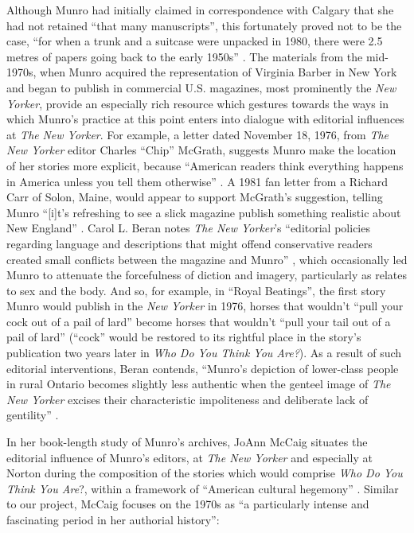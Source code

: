 \begin{paper}
Although Munro had initially claimed in correspondence with Calgary that
she had not retained ``that many manuscripts'', this fortunately proved
not to be the case, ``for when a trunk and a suitcase were unpacked in
1980, there were 2.5 metres of papers going back to the early 1950s''
\citep[xxix]{tener_archival_1986}. The materials from the mid-1970s,
when Munro acquired the representation of Virginia Barber in New York
and began to publish in commercial U.S. magazines, most prominently the
\emph{New Yorker}, provide an especially rich resource which gestures
towards the ways in which Munro's practice at this point enters into
dialogue with editorial influences at \emph{The} \emph{New Yorker}. For example, a letter dated
November 18, 1976, from \emph{The New Yorker} editor Charles
``Chip'' McGrath, suggests Munro make the location of her
stories more explicit, because ``American readers think everything
happens in America unless you tell them otherwise'' \citep{mcgrath_letter_1976}. A 1981 fan letter
from a Richard Carr of Solon, Maine, would appear to support McGrath's
suggestion, telling Munro ``{[}i{]}t's refreshing to see a slick
magazine publish something realistic about New England'' \citep{carr_letter_1981}. Carol L. Beran notes \emph{The New Yorker}'s ``editorial
policies regarding language and descriptions that might offend
conservative readers created small conflicts between the magazine and
Munro'' \citep[207]{beran_luxury_1998}, which occasionally led Munro to attenuate the
forcefulness of diction and imagery, particularly as relates to sex and
the body. And so, for example, in ``Royal Beatings'', the first story
Munro would publish in the \emph{New Yorker} in 1976, horses that
wouldn't ``pull your cock out of a pail of lard'' become horses that
wouldn't ``pull your tail out of a pail of lard'' \citep[207--208]{beran_luxury_1998} (``cock''
would be restored to its rightful place in the story's publication two
years later in \emph{Who Do You Think You Are?}). As a result of such
editorial interventions, Beran contends, ``Munro's depiction of
lower-class people in rural Ontario becomes slightly less authentic when
the genteel image of \emph{The} \emph{New Yorker} excises their
characteristic impoliteness and deliberate lack of gentility'' \citep[209]{beran_luxury_1998}.

In her book-length study of Munro's archives, JoAnn McCaig situates the
editorial influence of Munro's editors, at \emph{The New Yorker} and
especially at Norton during the composition of the stories which would
comprise \emph{Who Do You Think You Are}?, within a framework of
``American cultural hegemony'' \citep[121]{mccaig_reading_2002}. Similar to our project,
McCaig focuses on the 1970s as ``a particularly intense and fascinating
period in her authorial history'':


\end{paper}
